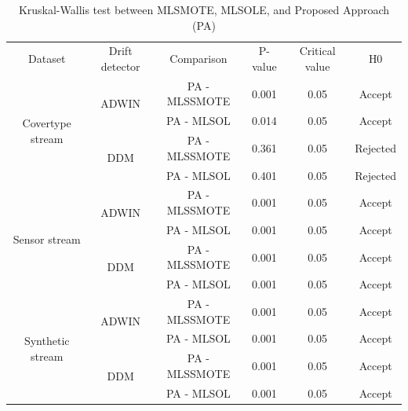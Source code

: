 \begin{table}[h!]
  \centering
  \caption{Kruskal-Wallis test between MLSMOTE, MLSOLE, and Proposed Approach (PA)}
  \label{tab:4_first_proposal_result_table_3}

  \begin{tabular}{|c|c|c|c|c|c|}
  \hline
  \multirow{2}{*}{Dataset} & \multirow{2}{*}{Drift detector} & \multirow{2}{*}{Comparison} & \multirow{2}{*}{P-value} & \multirow{2}{*}{Critical value} & \multirow{2}{*}{H0} \\ 
                           &                                 &                             &                           &                                 &  \\
  \hline
  \multirow{4}{*}{Covertype stream} & \multirow{2}{*}{ADWIN} & PA - MLSSMOTE & 0.001 & 0.05 & Accept \\ \cline{3-6}
                                    &                        & PA - MLSOL    & 0.014 & 0.05 & Accept \\ \cline{2-6}
                                    & \multirow{2}{*}{DDM}   & PA - MLSSMOTE & 0.361 & 0.05 & Rejected \\ \cline{3-6}
                                    &                        & PA - MLSOL    & 0.401 & 0.05 & Rejected \\ 
  \hline
  \multirow{4}{*}{Sensor stream} & \multirow{2}{*}{ADWIN} & PA - MLSSMOTE & 0.001 & 0.05 & Accept \\ \cline{3-6}
                                 &                        & PA - MLSOL    & 0.001 & 0.05 & Accept \\ \cline{2-6}
                                 & \multirow{2}{*}{DDM}   & PA - MLSSMOTE & 0.001 & 0.05 & Accept \\ \cline{3-6}
                                 &                        & PA - MLSOL    & 0.001 & 0.05 & Accept \\ 
  \hline
  \multirow{4}{*}{Synthetic stream} & \multirow{2}{*}{ADWIN} & PA - MLSSMOTE & 0.001 & 0.05 & Accept \\ \cline{3-6}
                                    &                        & PA - MLSOL    & 0.001 & 0.05 & Accept \\ \cline{2-6}
                                    & \multirow{2}{*}{DDM}   & PA - MLSSMOTE & 0.001 & 0.05 & Accept \\ \cline{3-6}
                                    &                        & PA - MLSOL    & 0.001 & 0.05 & Accept \\ 
  \hline
  \end{tabular}
  \end{table}